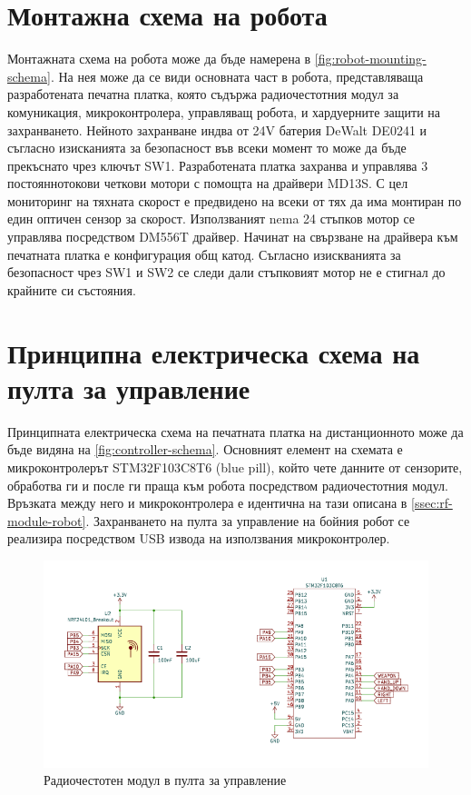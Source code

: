 \section{Монтажна схема на робота}

Монтажната схема на робота може да бъде намерена в \cref{fig:robot-mounting-schema}. На нея може да се види основната част в робота, представляваща разработената печатна платка, която съдържа радиочестотния модул за комуникация, микроконтролера, управляващ робота, и хардуерните защити на захранването. Нейното захранване индва от 24V батерия DeWalt DE0241 и съгласно изисканията за безопасност във всеки момент то може да бъде прекъснато чрез ключът SW1. Разработената платка захранва и управлява 3 постояннотокови четкови мотори с помощта на драйвери MD13S. С цел мониторинг на тяхната скорост е предвидено на всеки от тях да има монтиран по един оптичен сензор за скорост. Използваният nema 24 стъпков мотор се управлява посредством DM556T драйвер. Начинат на свързване на драйвера към печатната платка е конфигурация общ катод. Съгласно изискванията за безопасност чрез SW1 и SW2 се следи дали стъпковият мотор не е стигнал до крайните си състояния.



\section{Принципна електрическа схема на пулта за управление}

Принципната електрическа схема на печатната платка на дистанционното може да бъде видяна на \cref{fig:controller-schema}. Основният елемент на схемата е микроконтролерът STM32F103C8T6 (blue pill), който чете данните от сензорите, обработва ги и после ги праща към робота посредством радиочестотния модул. Връзката между него и микроконтролера е идентична на тази описана в \cref{ssec:rf-module-robot}. Захранването на пулта за управление на бойния робот се реализира посредством USB извода на използвания микроконтролер.

\begin{figure}[H]
    \centering
    \includegraphics[width=0.6\linewidth]{images/rf-module-controller.png}
    
    \caption{Радиочестотен модул в пулта за управление}
    \label{fig:rf-module-controller} 
\end{figure}

